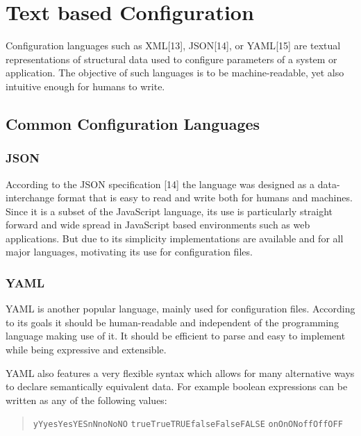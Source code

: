\documentclass[
  a4paper,
  bibtex,
  english,
  nomenclature]{kthlatex/kththesis/kththesis}
\begin{document}
\hypertarget{sec:text-based-configuration}{%
\section{Text based Configuration}\label{sec:text-based-configuration}}

Configuration languages such as XML{[}13{]}, JSON{[}14{]}, or
YAML{[}15{]} are textual representations of structural data used to
configure parameters of a system or application. The objective of such
languages is to be machine-readable, yet also intuitive enough for
humans to write.

\hypertarget{sec:common-configuration-languages}{%
\subsection{Common Configuration
Languages}\label{sec:common-configuration-languages}}

\hypertarget{sec:json}{%
\subsubsection{JSON}\label{sec:json}}

According to the JSON specification {[}14{]} the language was designed
as a data-interchange format that is easy to read and write both for
humans and machines. Since it is a subset of the JavaScript language,
its use is particularly straight forward and wide spread in JavaScript
based environments such as web applications. But due to its simplicity
implementations are available and for all major languages, motivating
its use for configuration files.

\hypertarget{sec:yaml}{%
\subsubsection{YAML}\label{sec:yaml}}

YAML is another popular language, mainly used for configuration files.
According to its goals it should be human-readable and independent of
the programming language making use of it. It should be efficient to
parse and easy to implement while being expressive and extensible.

YAML also features a very flexible syntax which allows for many
alternative ways to declare semantically equivalent data. For example
boolean expressions can be written as any of the following values:

\begin{quote}
\texttt{y\textbar{}Y\textbar{}yes\textbar{}Yes\textbar{}YES\textbar{}n\textbar{}N\textbar{}no\textbar{}No\textbar{}NO}
\texttt{true\textbar{}True\textbar{}TRUE\textbar{}false\textbar{}False\textbar{}FALSE}
\texttt{on\textbar{}On\textbar{}ON\textbar{}off\textbar{}Off\textbar{}OFF}
\end{quote}
\end{document}
